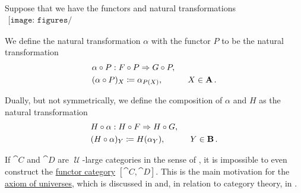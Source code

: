 \begin{definition}\label{def:composition_of_natural_transformation_and_functor}
  Suppose that we have the functors and natural transformations
  \begin{equation}\label{eq:def:composition_of_natural_transformation_and_functor/diagram}
    \begin{aligned}
      \texttt{[image: figures/def\_\_composition\_of\_natural\_transformation\_and\_functor.pdf]}
    \end{aligned}
  \end{equation}

  We define the  natural transformation \( \alpha \) with the functor \( P \) to be the natural transformation
  \begin{equation}\label{eq:def:composition_of_natural_transformation_and_functor/pre}
    \begin{aligned}
      &\alpha \bincirc P: F \bincirc P \Rightarrow G \bincirc P, \\
      &(\alpha \bincirc P)_X \coloneqq \alpha_{P(X)}, \quad\quad\quad X \in \cat{A}.
    \end{aligned}
  \end{equation}

  Dually, but not symmetrically, we define the composition of \( \alpha \) and \( H \) as the natural transformation
  \begin{equation}\label{eq:def:composition_of_natural_transformation_and_functor/post}
    \begin{aligned}
      &H \bincirc \alpha: H \bincirc F \Rightarrow H \bincirc G, \\
      &(H \bincirc \alpha)_Y \coloneqq H(\alpha_Y), \quad\quad\quad Y \in \cat{B}.
    \end{aligned}
  \end{equation}
\end{definition}

\begin{remark}\label{rem:functor_category_size}
  If \( \cat{C} \) and \( \cat{D} \) are \( \mscrU \)-large categories in the sense of , it is impossible to even construct the \hyperref[def:functor_category]{functor category} \( [\cat{C}, \cat{D}] \). This is the main motivation for the \hyperref[def:axiom_of_universes]{axiom of universes}, which is discussed in  and, in relation to category theory, in .
\end{remark}

